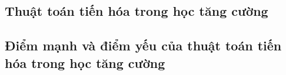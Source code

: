 \subsection{Thuật toán tiến hóa trong học tăng cường}

\newpage
\subsection{Điểm mạnh và điểm yếu của thuật toán tiến hóa trong học tăng cường}

\newpage